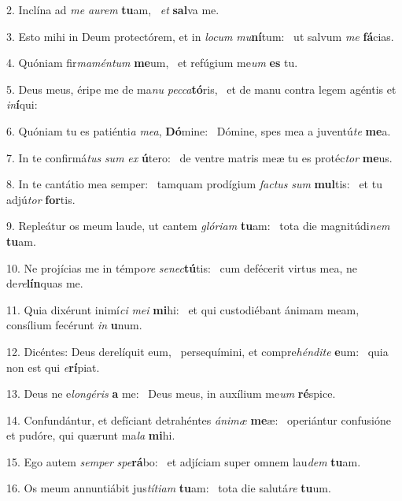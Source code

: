 2. Inclína ad \textit{me} \textit{au}\textit{rem} \textbf{tu}am, \ast\  \textit{et} \textbf{sal}va me.\

3. Esto mihi in Deum protectórem, et in \textit{lo}\textit{cum} \textit{mu}\textbf{ní}tum: \ast\  ut salvum \textit{me} \textbf{fá}cias.\

4. Quóniam fir\textit{ma}\textit{mén}\textit{tum} \textbf{me}um, \ast\  et refúgium me\textit{um} \textbf{es} tu.\

5. Deus meus, éripe me de ma\textit{nu} \textit{pec}\textit{ca}\textbf{tó}ris, \ast\  et de manu contra legem agéntis et \textit{in}\textbf{í}qui:\

6. Quóniam tu es patiénti\textit{a} \textit{me}\textit{a}, \textbf{Dó}mine: \ast\  Dómine, spes mea a juventú\textit{te} \textbf{me}a.\

7. In te confirmá\textit{tus} \textit{sum} \textit{ex} \textbf{ú}tero: \ast\  de ventre matris meæ tu es protéc\textit{tor} \textbf{me}us.\

8. In te cantátio mea semper: \dag\  tamquam prodígium \textit{fac}\textit{tus} \textit{sum} \textbf{mul}tis: \ast\  et tu adjú\textit{tor} \textbf{for}tis.\

9. Repleátur os meum laude, ut cantem \textit{gló}\textit{ri}\textit{am} \textbf{tu}am: \ast\  tota die magnitúdi\textit{nem} \textbf{tu}am.\

10. Ne projícias me in témpo\textit{re} \textit{se}\textit{nec}\textbf{tú}tis: \ast\  cum defécerit virtus mea, ne de\textit{re}\textbf{lín}quas me.\

11. Quia dixérunt inimí\textit{ci} \textit{me}\textit{i} \textbf{mi}hi: \ast\  et qui custodiébant ánimam meam, consílium fecérunt \textit{in} \textbf{u}num.\

12. Dicéntes: Deus derelíquit eum, \dag\  persequímini, et compre\textit{hén}\textit{di}\textit{te} \textbf{e}um: \ast\  quia non est qui \textit{e}\textbf{rí}piat.\

13. Deus ne e\textit{lon}\textit{gé}\textit{ris} \textbf{a} me: \ast\  Deus meus, in auxílium me\textit{um} \textbf{ré}spice.\

14. Confundántur, et defíciant detrahéntes \textit{á}\textit{ni}\textit{mæ} \textbf{me}æ: \ast\  operiántur confusióne et pudóre, qui quærunt ma\textit{la} \textbf{mi}hi.\

15. Ego autem \textit{sem}\textit{per} \textit{spe}\textbf{rá}bo: \ast\  et adjíciam super omnem lau\textit{dem} \textbf{tu}am.\

16. Os meum annuntiábit jus\textit{tí}\textit{ti}\textit{am} \textbf{tu}am: \ast\  tota die salutá\textit{re} \textbf{tu}um.\

